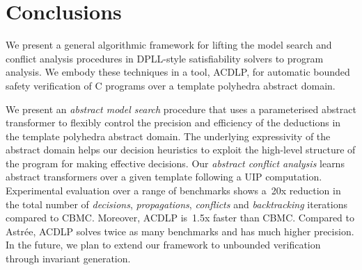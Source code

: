 \section{Conclusions}

We present a general algorithmic framework for lifting the
model search and conflict analysis procedures in DPLL-style satisfiability
solvers to program analysis.  We embody these techniques in a tool, ACDLP,
for automatic bounded safety verification of C programs over a template
polyhedra abstract domain.

We present an \emph{abstract model search} procedure that uses a
parameterised abstract transformer to flexibly control the precision and
efficiency of the deductions in the template polyhedra abstract domain.  The
underlying expressivity of the abstract domain helps our decision heuristics
to exploit the high-level structure of the program for making effective
decisions.  Our \emph{abstract conflict analysis} learns abstract
transformers over a given template following a UIP computation. 
Experimental evaluation over a range of benchmarks shows a~20x reduction in
the total number of \emph{decisions}, \emph{propagations}, \emph{conflicts}
and \emph{backtracking} iterations compared to CBMC.  Moreover, ACDLP
is~1.5x faster than CBMC.  Compared to Astr{\'e}e, ACDLP solves twice as
many benchmarks and has much higher precision.  In the future, we plan to
extend our framework to unbounded verification through invariant generation.

